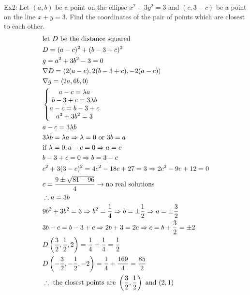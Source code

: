 \documentclass[11pt, fleqn]{article}
\begin{document}
Ex2: Let $(a,b)$ be a point on the ellipse $x^2+3y^2=3$ and $(c,3-c)$ be a point on the line $x+y=3$. Find the coordinates of the pair of points which are closest to each other.
\begin{align*}
    &\text{let $D$ be the distance squared}\\
    &D=(a-c)^2+(b-3+c)^2\\
    &g=a^2+3b^2-3=0\\
    &\nabla D=\left\langle 2(a-c),2(b-3+c),-2(a-c) \right\rangle\\
    &\nabla g=\left\langle 2a,6b,0 \right\rangle\\
    &\left\{\begin{matrix} a-c=\lambda a\\b-3+c=3\lambda b\\a-c=b-3+c\\a^2+3b^2=3 \end{matrix}\right.\\
    &a-c=3\lambda b\\
    &3\lambda b=\lambda a\Rightarrow \lambda=0\text{ or }3b=a\\
    &\text{if }\lambda=0, a-c=0\Rightarrow a=c\\
    &b-3+c=0\Rightarrow b=3-c\\
    &c^2+3(3-c)^2=4c^2-18c+27=3\Rightarrow 2c^2-9c+12=0\\
    &c=\frac{9\pm\sqrt{81-96}}{4}\to\text{no real solutions}\\
    &\therefore a=3b\\
    &9b^2+3b^2=3\Rightarrow b^2=\frac{1}{4}\Rightarrow b=\pm\frac{1}{2}\Rightarrow a=\pm\frac{3}{2}\\
    &3b-c=b-3+c\Rightarrow 2b+3=2c\Rightarrow c=b+\frac{3}{2}=\pm2\\
    &D\left( \frac{3}{2},\frac{1}{2},2 \right)=\frac{1}{4}+\frac{1}{4}=\frac{1}{2}\\
    &D\left( -\frac{3}{2},-\frac{1}{2},-2 \right)=\frac{1}{4}+\frac{169}{4}=\frac{85}{2}\\
    &\therefore \text{ the closest points are }\left( \frac{3}{2},\frac{1}{2} \right)\text{ and }(2,1)
\end{align*}
\end{document}

